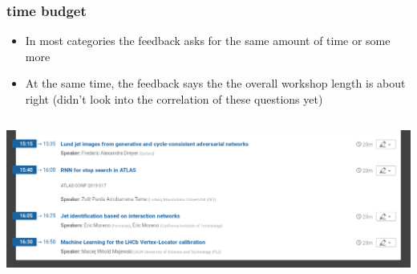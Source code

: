 \begin{frame}
  \frametitle{time budget}
  \begin{itemize}
    \item In most categories the feedback asks for the same amount of time or some more
    \item At the same time, the feedback says the the overall workshop length is about right
    \newline (didn't look into the correlation of these questions yet)
  \end{itemize}
\end{frame}

\begin{frame}
  \begin{columns}
    \begin{column}{.98\textwidth}
      \includegraphics[width=\textwidth]{./agenda.png}
    \end{column}
  \end{columns}
\end{frame}

\appendix
\begin{frame}

  \vspace{.3\textheight}

\end{frame}
